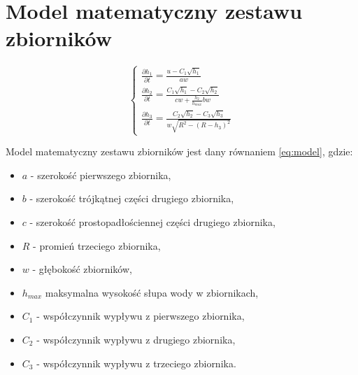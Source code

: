 \section{Model matematyczny zestawu zbiorników}
\label{sec:model}


\begin{equation}\label{eq:model}
	\left \{
	\begin{array}{lr}
		\frac{\partial h_{1}}{\partial t} = \frac{u - C_{1}\sqrt{h_{1}}}{aw} \\[8pt]
		\frac{\partial h_{2}}{\partial t} = \frac{C_{1}\sqrt{h_{1}} -  C_{2}\sqrt{h_{2}}}{cw + \frac{h_{2}}{h_{max}}bw} \\[20pt]
		\frac{\partial h_{3}}{\partial t} = \frac{C_{2}\sqrt{h_{2}} -  C_{3}\sqrt{h_{3}}}{w\sqrt{R^{2} - (R - h_{3})^{2}}}
	\end{array}
	\right.
\end{equation}

Model matematyczny zestawu zbiorników jest dany równaniem \ref{eq:model}, gdzie:
\begin{itemize}
	\item $a$ - szerokość pierwszego zbiornika,
	\item $b$ - szerokość trójkątnej części drugiego zbiornika,
	\item $c$ - szerokość prostopadłościennej części drugiego zbiornika,
	\item $R$ - promień trzeciego zbiornika,
	\item $w$ - głębokość zbiorników,
	\item $h_{max}$ maksymalna wysokość słupa wody w zbiornikach,
	\item $C_{1}$ - współczynnik wypływu z pierwszego zbiornika,
	\item $C_{2}$ - współczynnik wypływu z drugiego zbiornika,
	\item $C_{3}$ - współczynnik wypływu z trzeciego zbiornika.
\end{itemize}